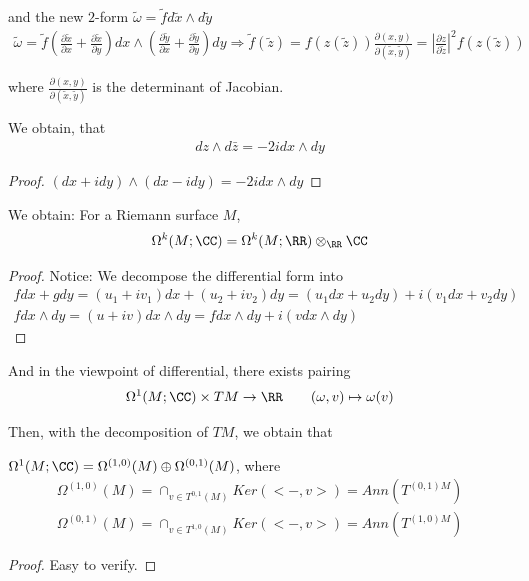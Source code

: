 \documentclass[Total.tex]{subfiles}
\begin{document}
	and the new $2$-form $\tilde{\omega}=\tilde{f}d\tilde{x}\wedge d\tilde{y}$
	\begin{gather*}
		\tilde{\omega}=\tilde{f}(\frac{\partial \tilde{x}}{\partial x}+\frac{\partial \tilde{x}}{\partial y})dx\wedge (\frac{\partial \tilde{y}}{\partial x}+\frac{\partial \tilde{y}}{\partial y})dy\Rightarrow \tilde{f}(\tilde{z})=f(z(\tilde{z}))\frac{\partial (x,y)}{\partial(\tilde{x},\tilde{y})}=|\frac{\partial z}{\partial \tilde{z}}|^2 f(z(\tilde{z}))
	\end{gather*}
	
	where $\frac{\partial (x,y)}{\partial(\tilde{x},\tilde{y})}$ is the determinant of Jacobian. 
	
	
	
	\begin{proposition}
		We obtain, that
		\begin{gather*}
			dz\wedge d\bar{z}=-2idx\wedge dy
		\end{gather*}
	\end{proposition}
	\begin{proof}
		$(dx+idy)\wedge (dx-idy)=-2i dx\wedge dy$
	\end{proof}
	
	
	\begin{proposition}
		We obtain: For a Riemann surface $M$,
		\begin{gather*}
			\Omega^k(M;\CC)=\Omega^k(M;\RR)\otimes_\RR \CC
		\end{gather*}
	\end{proposition}
	\begin{proof}
		Notice: We decompose the differential form into
		\begin{gather*}
			fdx+gdy=(u_1+iv_1)dx+(u_2+iv_2)dy=(u_1dx+u_2dy)+i(v_1dx+v_2dy)\\
			fdx\wedge dy=(u+iv)dx\wedge dy=fdx\wedge dy+i(vdx\wedge dy)
		\end{gather*}
	\end{proof}
	
	
	And in the viewpoint of differential, there exists pairing
	\begin{gather*}
		\Omega^1(M;\CC)\times TM\rightarrow \RR\qquad (\omega,v)\mapsto \omega(v)
	\end{gather*}
	
	Then, with the decomposition of $TM$, we obtain that
	
	\begin{corollary}
		$\Omega^1(M;\CC)=\Omega^{(1,0)}(M)\oplus \Omega^{(0,1)}(M)$, where
		\begin{gather*}
			\Omega^{(1,0)}(M)=\cap_{v\in T^{0,1}(M)} Ker(<-,v>)=Ann(T^{(0,1)M})\\
			 \Omega^{(0,1)}(M)=\cap_{v\in T^{1,0}(M)} Ker(<-,v>)=Ann(T^{(1,0)M})
		\end{gather*}
	\end{corollary}
	\begin{proof}
		Easy to verify. 
	\end{proof}
	
\end{document}
